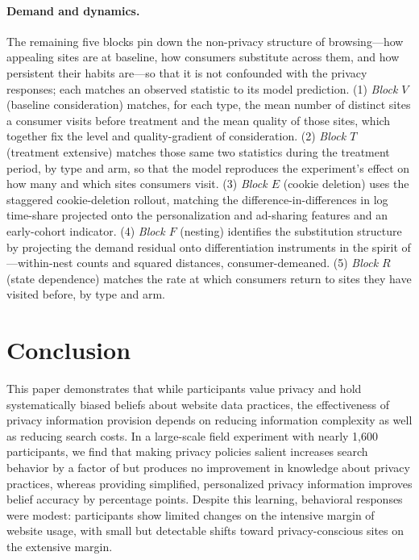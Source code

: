 \documentclass[12pt]{article}
\theoremstyle{definition}
\theoremstyle{remark}
\begin{document}
\paragraph{Demand and dynamics.} The remaining five blocks pin down the non-privacy structure of browsing---how appealing sites are at baseline, how consumers substitute across them, and how persistent their habits are---so that it is not confounded with the privacy responses; each matches an observed statistic to its model prediction. (1) \emph{Block $V$} (baseline consideration) matches, for each type, the mean number of distinct sites a consumer visits before treatment and the mean quality of those sites, which together fix the level and quality-gradient of consideration. (2) \emph{Block $T$} (treatment extensive) matches those same two statistics during the treatment period, by type and arm, so that the model reproduces the experiment's effect on how many and which sites consumers visit. (3) \emph{Block $E$} (cookie deletion) uses the staggered cookie-deletion rollout, matching the difference-in-differences in log time-share projected onto the personalization and ad-sharing features and an early-cohort indicator. (4) \emph{Block $F$} (nesting) identifies the substitution structure by projecting the demand residual onto differentiation instruments in the spirit of \citet{berry1995automobile}---within-nest counts and squared distances, consumer-demeaned. (5) \emph{Block $R$} (state dependence) matches the rate at which consumers return to sites they have visited before, by type and arm.

\section{Conclusion}

This paper demonstrates that while participants value privacy and hold systematically biased beliefs about website data practices, the effectiveness of privacy information provision depends on reducing information complexity as well as reducing search costs. In a large-scale field experiment with nearly 1,600 participants, we find that making privacy policies salient increases search behavior by a factor of \policyVisitSaliencyFold{} but produces no improvement in knowledge about privacy practices, whereas providing simplified, personalized privacy information improves belief accuracy by \beliefCorrectStrictInfoPP{} percentage points. Despite this learning, behavioral responses were modest: participants show limited changes on the intensive margin of website usage, with small but detectable shifts toward privacy-conscious sites on the extensive margin.
\end{document}
